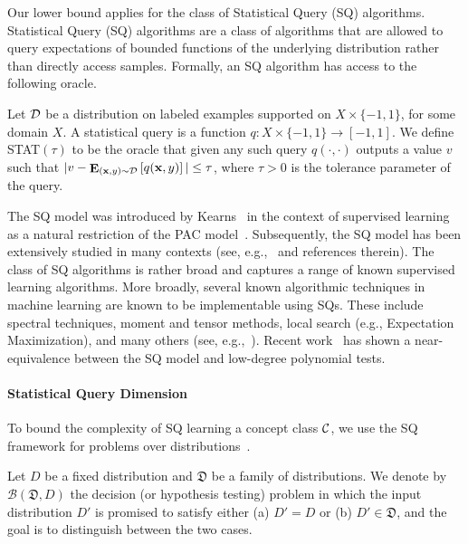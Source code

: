 \documentclass{theoretics}
\renewcommand\vec[1]{\mathbf{#1}}
\DeclareMathOperator*{\E}{\mathbf{E}}
\newcommand{\D}{D}
\newcommand{\1}{\Ind}
\begin{document}
Our lower bound applies for the class of Statistical Query (SQ) algorithms.
Statistical Query (SQ) algorithms are a class of algorithms that are allowed
to query expectations of bounded functions of the underlying distribution
rather than directly access samples. Formally, an SQ algorithm has access to the following oracle.

\begin{definition} \label{def:stat-oracle}\label{def:stat}
Let $\cal{D}$ be a distribution on labeled examples supported on $X \times \{-1, 1\}$, for some domain $X$.
A statistical query is a function $q: X \times \{-1, 1\} \to [-1, 1]$.  We define
\textsc{STAT}$(\tau)$ to be the oracle that given any such query $q(\cdot, \cdot)$
outputs a value $v$ such that $|v - \E_{(\vec x, y) \sim \cal{D}}\left[q(\vec x, y)\right]| \leq \tau$,
where $\tau>0$ is the tolerance parameter of the query.
\end{definition}

The SQ model was introduced by Kearns~\cite{Kearns:98} in the context of supervised learning as a
natural restriction of the PAC model~\cite{val84}.  Subsequently, the SQ model has been
extensively studied in many contexts (see, e.g.,~\cite{Feldman16b} and references therein).
The class of SQ algorithms is rather broad and captures a range of known supervised learning
algorithms.  More broadly, several known algorithmic techniques in machine learning are known to be
implementable using SQs. These include spectral techniques, moment and tensor methods, local search
(e.g., Expectation Maximization), and many others (see, e.g.,~\cite{FeldmanGRVX17, DBLP:journals/mor/FeldmanGV21}).
Recent work~\cite{BBHLS21} has shown a near-equivalence between the SQ model and low-degree
polynomial tests.



\paragraph{Statistical Query Dimension}
To bound the complexity of SQ learning a concept class $\cal C$,
we use the SQ framework for problems over distributions~\cite{FeldmanGRVX17}.
\begin{definition} \label{def:decision}
    Let $\D$ be a fixed distribution and $\mathfrak D$ be a family of distributions.
    We denote by $\mathcal{B}(\mathfrak D, \D)$ the decision (or hypothesis testing) problem
    in which the input distribution $\D'$ is promised to satisfy either
    (a) $\D' = \D$ or (b) $\D' \in \mathfrak D$, and the goal
    is to distinguish between the two cases.
\end{definition}
\end{document}
